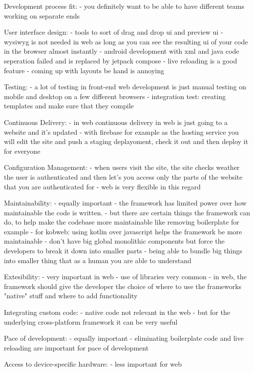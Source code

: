 Development process fit: 
- you definitely want to be able to have different teams working on separate ends

User interface design:
- tools to sort of drag and drop ui and preview ui
- wysiwyg is not needed in web as long as you can see the resulting ui of your code in the browser almost instantly
- android development with xml and java code seperation failed and is replaced by jetpack compose
- live reloading is a good feature
- coming up with layouts be hand is annoying

Testing:
- a lot of testing in front-end web development is just manual testing on mobile and desktop on a few different browsers
- integration test: creating templates and make sure that they compile

Continuous Delivery: 
- in web continuous delivery in web is just going to a website and it's updated
- with firebase for example as the hosting service you will edit the site and push a staging deplayoment, check it out and then deploy it for everyone

Configuration Management: 
- when users visit the site, the site checks weather the user is authenticated and then let's you access only the parts of the website that you are authenticated for
- web is very flexible in this regard

Maintainability: 
- equally important
- the framework has limited power over how maintainable the code is written. 
- but there are certain things the framework can do, to help make the codebase more maintainable like removing boilerplate for example
- for kobweb: using kotlin over javascript helps the framework be more maintainable
- don't have big global monolithic components but force the developers to break it down into smaller parts - being able to bundle big things into smaller thing that as a human you are able to understand

Extesibility: 
- very important in web
- use of libraries very common
- in web, the framework should give the developer the choice of where to use the frameworks "native" stuff and where to add functionality

Integrating custom code:
- native code not relevant in the web
- but for the underlying cross-platform framework it can be very useful

Pace of development: 
- equally important
- eliminating boilerplate code and live reloading are important for pace of development

Access to device-specific hardware: 
- less important for web

